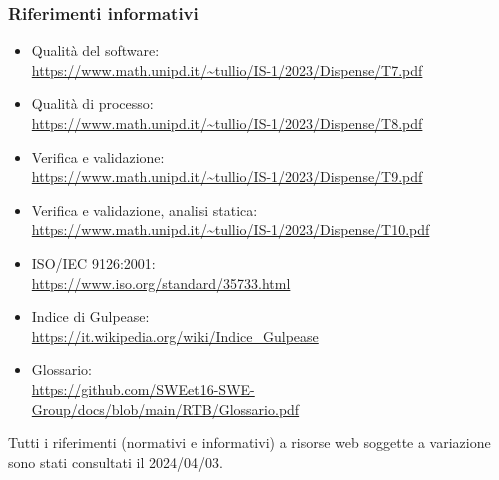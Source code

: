 \subsubsection{Riferimenti informativi}
\begin{itemize}
    \item Qualità del software: \\
    \url{https://www.math.unipd.it/~tullio/IS-1/2023/Dispense/T7.pdf}
    \item Qualità di processo:\\
    \url{https://www.math.unipd.it/~tullio/IS-1/2023/Dispense/T8.pdf}
    \item Verifica e validazione: \\
    \url{https://www.math.unipd.it/~tullio/IS-1/2023/Dispense/T9.pdf}
    \item Verifica e validazione, analisi statica:\\
    \url{https://www.math.unipd.it/~tullio/IS-1/2023/Dispense/T10.pdf}
    \item ISO/IEC 9126:2001: \\
    \url{https://www.iso.org/standard/35733.html}
    \item Indice di Gulpease: \\
    \url{https://it.wikipedia.org/wiki/Indice_Gulpease}
    \item Glossario: \\
    \url{https://github.com/SWEet16-SWE-Group/docs/blob/main/RTB/Glossario.pdf} 
\end{itemize}

Tutti i riferimenti (normativi e informativi) a risorse web soggette a variazione sono stati consultati il 2024/04/03.

